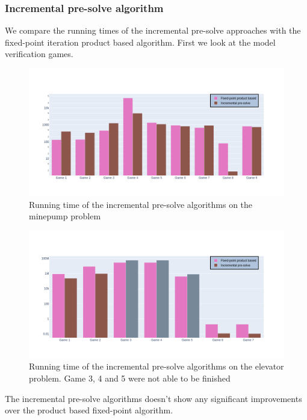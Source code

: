 \subsubsection{Incremental pre-solve algorithm}
We compare the running times of the incremental pre-solve approaches with the fixed-point iteration product based algorithm. First we look at the model verification games.
\begin{figure}[H]
	\includegraphics[width=1\linewidth]{"results/minepump/Fixed-point product based_Incremental pre-solve_"}
	\caption{Running time of the incremental pre-solve algorithms on the minepump problem}
	\label{fig:minepumpzlnks}
\end{figure}%
\begin{figure}[H]
	\includegraphics[width=1\linewidth]{"results/elevator/Fixed-point product based_Incremental pre-solve_"}
	\caption{Running time of the incremental pre-solve algorithms on the elevator problem. Game 3, 4 and 5 were not able to be finished }
	\label{fig:elevatorzlnks}
\end{figure}%
The incremental pre-solve algorithms doesn't show any significant improvements over the product based fixed-point algorithm.

